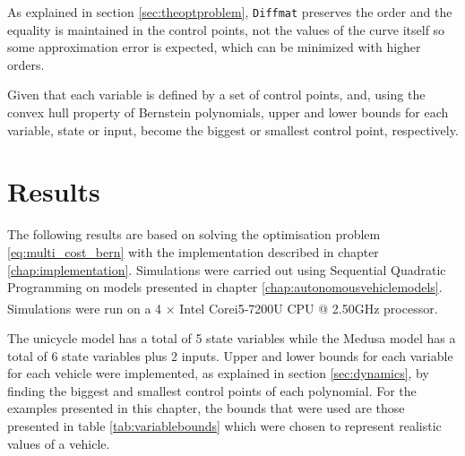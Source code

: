 \par As explained in section \ref{sec:theoptproblem}, \texttt{Diffmat} preserves the order and the equality is maintained in the control points, not the values of the curve itself so some approximation error is expected, which can be minimized with higher orders.

\par Given that each variable is defined by a set of control points, and, using the convex hull property of Bernstein polynomials, upper and lower bounds for each variable, state or input, become the biggest or smallest control point, respectively.


\section{Results}
\par The following results are based on solving the optimisation problem \eqref{eq:multi_cost_bern} with the implementation described in chapter \ref{chap:implementation}. Simulations were carried out using Sequential Quadratic Programming \cite{10.1007/978-0-387-35514-6_7} on models presented in chapter \ref{chap:autonomousvehiclemodels}. Simulations were run on a 4 × Intel\textsuperscript{\textcopyright} Core\texttrademark i5-7200U CPU @ 2.50GHz processor. 
\par The unicycle model has a total of 5 state variables while the Medusa model has a total of 6 state variables plus 2 inputs. Upper and lower bounds for each variable for each vehicle were implemented, as explained in section \ref{sec:dynamics}, by finding the biggest and smallest control points of each polynomial. For the examples presented in this chapter, the bounds that were used are those presented in table \ref{tab:variablebounds} which were chosen to represent realistic values of a vehicle.


